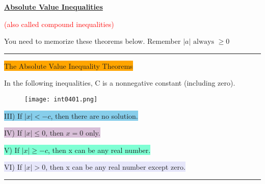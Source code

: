 
\vspace{0.6 cm}

\centerline{\underline{\textbf{\Large Absolute Value Inequalities}}}

\centerline{\textcolor{red}{(also called compound inequalities)}}

\vspace{0.3 cm}

You need to memorize these theorems below. Remember $|a| \text{ always } \geq 0$

\noindent\rule{\textwidth}{0.8pt}

\vspace{0.4 cm}

\centerline{\colorbox{orange}{\Large The Absolute Value Inequality Theorems}}

In the following inequalities, C is a nonnegative constant (including zero).

\begin{figure}[htb!]
  \centering
  \texttt{[image: int0401.png]}
\end{figure}

\colorbox{SkyBlue}{III) If $|x|<-c$, then there are no solution.}

\colorbox{Thistle}{IV) If $|x| \leq 0$, then $x=0$ only.}

\colorbox{Aquamarine}{V) If $|x| \geq -c$, then x can be any real number.}

\colorbox{Lavender}{VI) If $|x| > 0$, then x can be any real number except zero.}

\noindent\rule{\textwidth}{0.8pt}

